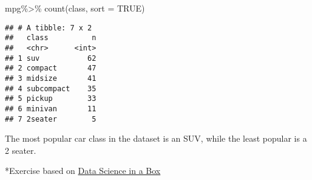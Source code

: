 \documentclass[
]{article}
\newenvironment{Shaded}{\begin{snugshade}}{\end{snugshade}}
\newcommand{\AttributeTok}[1]{\textcolor[rgb]{0.77,0.63,0.00}{#1}}
\newcommand{\ConstantTok}[1]{\textcolor[rgb]{0.00,0.00,0.00}{#1}}
\newcommand{\FunctionTok}[1]{\textcolor[rgb]{0.00,0.00,0.00}{#1}}
\newcommand{\NormalTok}[1]{#1}
\newcommand{\SpecialCharTok}[1]{\textcolor[rgb]{0.00,0.00,0.00}{#1}}
\begin{document}
\begin{Shaded}
\begin{Highlighting}[]
\NormalTok{mpg}\SpecialCharTok{\%\textgreater{}\%}
  \FunctionTok{count}\NormalTok{(class, }\AttributeTok{sort =} \ConstantTok{TRUE}\NormalTok{)}
\end{Highlighting}
\end{Shaded}

\begin{verbatim}
## # A tibble: 7 x 2
##   class          n
##   <chr>      <int>
## 1 suv           62
## 2 compact       47
## 3 midsize       41
## 4 subcompact    35
## 5 pickup        33
## 6 minivan       11
## 7 2seater        5
\end{verbatim}

The most popular car class in the dataset is an SUV, while the least
popular is a 2 seater.

*Exercise based on \href{https://datasciencebox.org/}{Data Science in a
Box}
\end{document}
